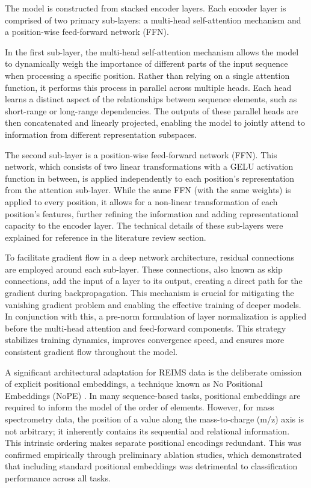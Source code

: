 The model is constructed from stacked encoder layers. Each encoder layer is comprised of two primary sub-layers: a multi-head self-attention mechanism and a position-wise feed-forward network (FFN).

In the first sub-layer, the multi-head self-attention mechanism allows the model to dynamically weigh the importance of different parts of the input sequence when processing a specific position. Rather than relying on a single attention function, it performs this process in parallel across multiple heads. Each head learns a distinct aspect of the relationships between sequence elements, such as short-range or long-range dependencies. The outputs of these parallel heads are then concatenated and linearly projected, enabling the model to jointly attend to information from different representation subspaces.

The second sub-layer is a position-wise feed-forward network (FFN). This network, which consists of two linear transformations with a GELU activation function in between, is applied independently to each position's representation from the attention sub-layer. While the same FFN (with the same weights) is applied to every position, it allows for a non-linear transformation of each position's features, further refining the information and adding representational capacity to the encoder layer. The technical details of these sub-layers were explained for reference in the literature review section.

To facilitate gradient flow in a deep network architecture, residual connections \citep{He2016} are employed around each sub-layer. These connections, also known as skip connections, add the input of a layer to its output, creating a direct path for the gradient during backpropagation. This mechanism is crucial for mitigating the vanishing gradient problem and enabling the effective training of deeper models. In conjunction with this, a pre-norm formulation of layer normalization \citep{Ba2016, Xiong2020} is applied before the multi-head attention and feed-forward components. This strategy stabilizes training dynamics, improves convergence speed, and ensures more consistent gradient flow throughout the model.

A significant architectural adaptation for REIMS data is the deliberate omission of explicit positional embeddings, a technique known as No Positional Embeddings (NoPE) \citep{Wang2024}. In many sequence-based tasks, positional embeddings are required to inform the model of the order of elements. However, for mass spectrometry data, the position of a value along the mass-to-charge (m/z) axis is not arbitrary; it inherently contains its sequential and relational information. This intrinsic ordering makes separate positional encodings redundant. This was confirmed empirically through preliminary ablation studies, which demonstrated that including standard positional embeddings was detrimental to classification performance across all tasks.


